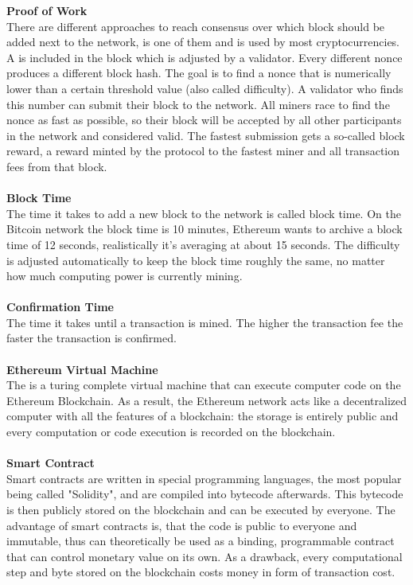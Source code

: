 \textbf{Proof of Work}\\
There are different approaches to reach consensus over which block should be added next to the network,  is one of them and is used by most cryptocurrencies. A  is included in the block which is adjusted by a validator. Every different nonce produces a different block hash. The goal is to find a nonce that is numerically lower than a certain threshold value (also called difficulty). A validator who finds this number can submit their block to the network. All miners race to find the nonce as fast as possible, so their block will be accepted by all other participants in the network and considered valid. The fastest submission gets a so-called block reward, a reward minted by the protocol to the fastest miner and all transaction fees from that block.
\\\\

\textbf{Block Time}\\
The time it takes to add a new block to the network is called block time. On the Bitcoin network the block time is 10 minutes\cite{bitcoin-whitepaper}, Ethereum wants to archive a block time of 12 seconds\cite{ethereum-blocktime}, realistically it's averaging at about 15 seconds\cite{ethereum-blocktime-chart}. The difficulty is adjusted automatically to keep the block time roughly the same, no matter how much computing power is currently mining.
\\\\

\textbf{Confirmation Time}\\
The time it takes until a transaction is mined. The higher the transaction fee the faster the transaction is confirmed.
\\\\

\textbf{Ethereum Virtual Machine}\\
The  is a turing complete virtual machine that can execute computer code on the Ethereum Blockchain. As a result, the Ethereum network acts like a decentralized computer with all the features of a blockchain: the storage is entirely public and every computation or code execution is recorded on the blockchain.
\\\\

\textbf{Smart Contract}\\
Smart contracts are written in special programming languages, the most popular being called "Solidity", and are compiled into bytecode afterwards. This bytecode is then publicly stored on the blockchain and can be executed by everyone. The advantage of smart contracts is, that the code is public to everyone and immutable, thus can theoretically be used as a binding, programmable contract that can control monetary value on its own. As a drawback, every computational step and byte stored on the blockchain costs money in form of transaction cost.
\\\\

